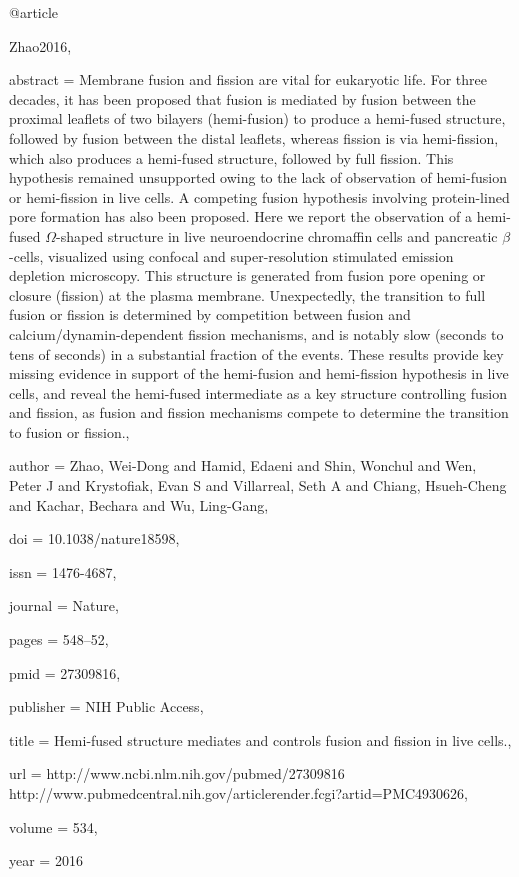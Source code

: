 @article{Zhao2016,

abstract = {Membrane fusion and fission are vital for eukaryotic life. For three decades, it has been proposed that fusion is mediated by fusion between the proximal leaflets of two bilayers (hemi-fusion) to produce a hemi-fused structure, followed by fusion between the distal leaflets, whereas fission is via hemi-fission, which also produces a hemi-fused structure, followed by full fission. This hypothesis remained unsupported owing to the lack of observation of hemi-fusion or hemi-fission in live cells. A competing fusion hypothesis involving protein-lined pore formation has also been proposed. Here we report the observation of a hemi-fused $\Omega$-shaped structure in live neuroendocrine chromaffin cells and pancreatic $\beta$-cells, visualized using confocal and super-resolution stimulated emission depletion microscopy. This structure is generated from fusion pore opening or closure (fission) at the plasma membrane. Unexpectedly, the transition to full fusion or fission is determined by competition between fusion and calcium/dynamin-dependent fission mechanisms, and is notably slow (seconds to tens of seconds) in a substantial fraction of the events. These results provide key missing evidence in support of the hemi-fusion and hemi-fission hypothesis in live cells, and reveal the hemi-fused intermediate as a key structure controlling fusion and fission, as fusion and fission mechanisms compete to determine the transition to fusion or fission.},

author = {Zhao, Wei-Dong and Hamid, Edaeni and Shin, Wonchul and Wen, Peter J and Krystofiak, Evan S and Villarreal, Seth A and Chiang, Hsueh-Cheng and Kachar, Bechara and Wu, Ling-Gang},

doi = {10.1038/nature18598},

issn = {1476-4687},

journal = {Nature},

pages = {548--52},

pmid = {27309816},

publisher = {NIH Public Access},

title = {{Hemi-fused structure mediates and controls fusion and fission in live cells.}},

url = {http://www.ncbi.nlm.nih.gov/pubmed/27309816 http://www.pubmedcentral.nih.gov/articlerender.fcgi?artid=PMC4930626},

volume = {534},

year = {2016}

}

